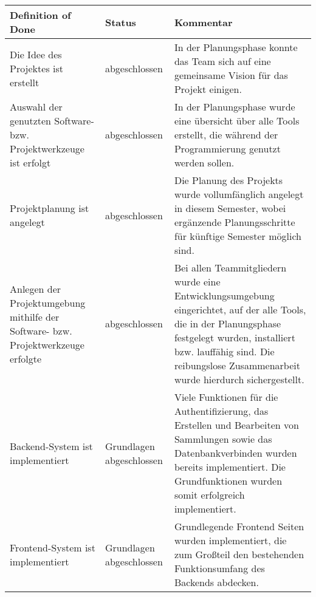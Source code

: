 \begin{table}[h!]
    \centering
    \renewcommand{\arraystretch}{1.5}
    \begin{tabular}{|p{}|p{}|p{}|}
        \hline
        \textbf{Definition of Done} & \textbf{Status} & \textbf{Kommentar} \\
        \hline
        Die Idee des Projektes ist erstellt &  abgeschlossen & In der Planungsphase konnte das Team sich auf eine gemeinsame Vision für das Projekt einigen. \\
        \hline
        Auswahl der genutzten Software- bzw. Projektwerkzeuge ist erfolgt & abgeschlossen & In der Planungsphase wurde eine übersicht über alle Tools erstellt, die während der Programmierung genutzt werden sollen. \\
        \hline
        Projektplanung ist angelegt & abgeschlossen & Die Planung des Projekts wurde vollumfänglich angelegt in diesem Semester, wobei ergänzende Planungsschritte für künftige Semester möglich sind. \\
        \hline
        Anlegen der Projektumgebung mithilfe der Software- bzw. Projektwerkzeuge erfolgte & abgeschlossen & Bei allen Teammitgliedern wurde eine Entwicklungsumgebung eingerichtet, auf der alle Tools, die in der Planungsphase festgelegt wurden, installiert bzw. lauffähig sind.
        Die reibungslose Zusammenarbeit wurde hierdurch sichergestellt. \\
        \hline
        Backend-System ist implementiert & Grundlagen abgeschlossen & Viele Funktionen für die Authentifizierung, das Erstellen und Bearbeiten von Sammlungen sowie das Datenbankverbinden wurden bereits implementiert.
        Die Grundfunktionen wurden somit erfolgreich implementiert. \\
        \hline
        Frontend-System ist implementiert & Grundlagen abgeschlossen &  Grundlegende Frontend Seiten wurden implementiert, die zum Großteil den bestehenden Funktionsumfang des Backends abdecken.\\
        \hline
    \end{tabular}
    \label{tab:definition-of-done-vergleich_1}
\end{table}
\newpage
